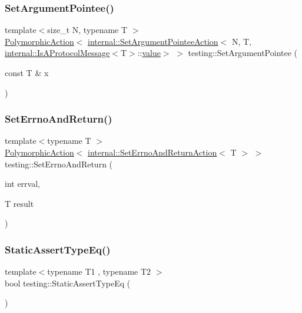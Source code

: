 \subsubsection{\texorpdfstring{SetArgumentPointee()}{SetArgumentPointee()}\hspace{0.1cm}{\footnotesize\ttfamily [2/2]}}
{\footnotesize\ttfamily template$<$size\+\_\+t N, typename T $>$ \\
\mbox{\hyperlink{classtesting_1_1_polymorphic_action}{Polymorphic\+Action}}$<$ \mbox{\hyperlink{structtesting_1_1internal_1_1_set_argument_pointee_action}{internal\+::\+Set\+Argument\+Pointee\+Action}}$<$ N, T, \mbox{\hyperlink{structtesting_1_1internal_1_1_is_a_protocol_message}{internal\+::\+Is\+A\+Protocol\+Message}}$<$T$>$\+::\mbox{\hyperlink{_obj__test_2lib_2googletest-master_2googlemock_2test_2gmock-matchers__test_8cc_a337b8a670efc0b086ad3af163f3121b6}{value}}$>$ $>$ testing\+::\+Set\+Argument\+Pointee (\begin{DoxyParamCaption}\item[{const T \&}]{x }\end{DoxyParamCaption})}

\mbox{\label{namespacetesting_a6f466024040fa05349773514ce1c6647}} 
\subsubsection{\texorpdfstring{SetErrnoAndReturn()}{SetErrnoAndReturn()}}
{\footnotesize\ttfamily template$<$typename T $>$ \\
\mbox{\hyperlink{classtesting_1_1_polymorphic_action}{Polymorphic\+Action}}$<$ \mbox{\hyperlink{classtesting_1_1internal_1_1_set_errno_and_return_action}{internal\+::\+Set\+Errno\+And\+Return\+Action}}$<$ T $>$ $>$ testing\+::\+Set\+Errno\+And\+Return (\begin{DoxyParamCaption}\item[{int}]{errval,  }\item[{T}]{result }\end{DoxyParamCaption})}

\mbox{\label{namespacetesting_a661e70fc6afeb5c085eed3716aa45059}} 
\subsubsection{\texorpdfstring{StaticAssertTypeEq()}{StaticAssertTypeEq()}}
{\footnotesize\ttfamily template$<$typename T1 , typename T2 $>$ \\
bool testing\+::\+Static\+Assert\+Type\+Eq (\begin{DoxyParamCaption}{ }\end{DoxyParamCaption})}

